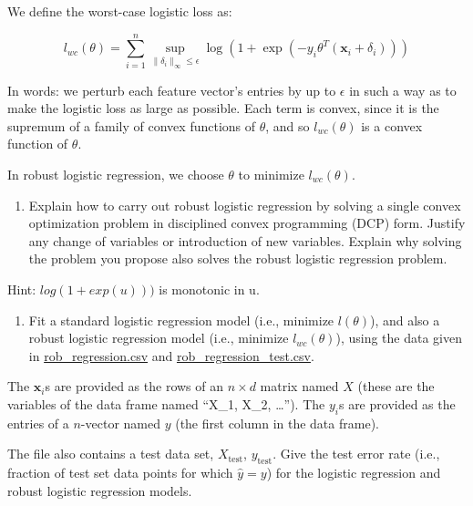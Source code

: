 \documentclass[
  letterpaper,
  DIV=11,
  numbers=noendperiod]{scrartcl}
\providecommand{\tightlist}{%
  \setlength{\itemsep}{0pt}\setlength{\parskip}{0pt}}\usepackage{longtable,booktabs,array}
\begin{document}
We define the worst-case logistic loss as:

\[
l_{wc}(\theta) = \sum_{i=1}^n \sup_{\|\delta_i\|_{\infty}\leq\epsilon}\log\left(1+\exp\left(-y_i\theta^T\left(\mathbf{x}_i+\delta_i\right)\right)\right)
\]

In words: we perturb each feature vector's entries by up to \(\epsilon\)
in such a way as to make the logistic loss as large as possible. Each
term is convex, since it is the supremum of a family of convex functions
of \(\theta\), and so \(l_{wc}(\theta)\) is a convex function of
\(\theta\).

In robust logistic regression, we choose \(\theta\) to minimize
\(l_{wc}(\theta)\).

\begin{enumerate}
\def\labelenumi{(\alph{enumi})}
\tightlist
\item
  Explain how to carry out robust logistic regression by solving a
  single convex optimization problem in disciplined convex programming
  (DCP) form. Justify any change of variables or introduction of new
  variables. Explain why solving the problem you propose also solves the
  robust logistic regression problem.
\end{enumerate}

Hint: \(log(1 + exp(u)))\) is monotonic in u.

\begin{enumerate}
\def\labelenumi{(\alph{enumi})}
\setcounter{enumi}{1}
\tightlist
\item
  Fit a standard logistic regression model (i.e., minimize
  \(l(\theta)\)), and also a robust logistic regression model (i.e.,
  minimize \(l_{wc}(\theta)\)), using the data given in
  \href{https://github.com/georgehagstrom/DATA609Spring2025/blob/main/website/assignments/labs/labData/rob_regression.csv}{rob\_regression.csv}
  and
  \href{https://github.com/georgehagstrom/DATA609Spring2025/blob/main/website/assignments/labs/labData/rob_regression_test.csv}{rob\_regression\_test.csv}.
\end{enumerate}

The \(\mathbf{x}_i\)s are provided as the rows of an \(n \times d\)
matrix named \(X\) (these are the variables of the data frame named
``X\_1, X\_2, \ldots{}''). The \(y_i\)s are provided as the entries of a
\(n\)-vector named \(y\) (the first column in the data frame).

The file also contains a test data set, \(X_{\mathrm{test}}\),
\(y_{\mathrm{test}}\). Give the test error rate (i.e., fraction of test
set data points for which \(\hat{y}= y\)) for the logistic regression
and robust logistic regression models.
\end{document}
